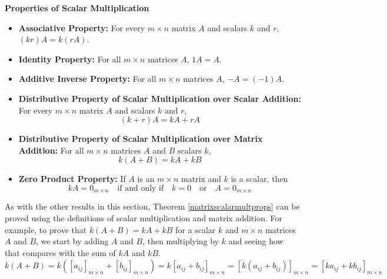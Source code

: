 \smallskip
\colorbox{ResultColor}{\bbm
\begin{thm}  \label{matrixscalarmultprops}\textbf{Properties of Scalar Multiplication}  

\begin{itemize}

\item  \textbf{Associative Property:}    For every  $m \times n$ matrix $A$ and scalars  $k$ and $r$, $(kr)A = k(rA)$.

\item  \textbf{Identity Property:}   For all $m \times n$ matrices $A$, $1A = A$.

\item  \textbf{Additive Inverse Property:} For all $m \times n$ matrices $A$, $-A = (-1)A$.  

\item  \textbf{Distributive Property of Scalar Multiplication over Scalar Addition:}    For every  $m \times n$ matrix $A$ and scalars  $k$ and $r$, \[(k+r)A = kA + rA\]

\item  \textbf{Distributive Property of Scalar Multiplication over Matrix Addition:} For all $m \times n$ matrices $A$ and $B$ scalars $k$, \[k(A+B) = kA + kB\] 

\item  \textbf{Zero Product Property:}   If $A$ is an $m \times n$ matrix and $k$ is a scalar, then 
\[kA = 0_{m \times n} \quad \text{if and only if} \quad k=0 \quad \text{or} \quad A = 0_{m \times n}\]


\end{itemize}

\end{thm}
\ebm}
\smallskip

As with the other results in this section, Theorem \ref{matrixscalarmultprops} can be proved using the definitions of scalar multiplication and matrix addition.  For example, to prove that $k(A+B) = kA + kB$ for a scalar $k$ and $m \times n$ matrices $A$ and $B$, we start by adding $A$ and $B$, then multiplying by $k$ and seeing how that compares with the sum of $kA$ and $kB$. \[ k(A+B) = k \left(\left[a_{ij}\right]_{m \times n} + \left[b_{ij}\right]_{m \times n}\right) = k \left[a_{ij} + b_{ij} \right]_{m \times n} = \left[k \left(a_{ij}+b_{ij}\right)\right]_{m \times n} = \left[ka_{ij} + kb_{ij}\right]_{m \times n}\]

